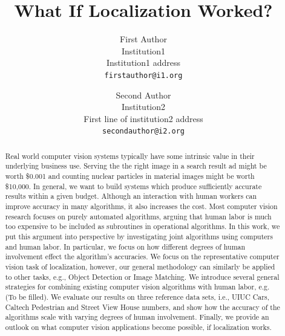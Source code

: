 \documentclass[10pt,twocolumn,letterpaper]{article}
\begin{document}
\title{What If Localization Worked?}

\author{First Author\\
Institution1\\
Institution1 address\\
{\tt\small firstauthor@i1.org}
\and
Second Author\\
Institution2\\
First line of institution2 address\\
{\tt\small secondauthor@i2.org}
}

\maketitle

\begin{abstract}
   Real world computer vision systems typically have some intrinsic value in their underlying business use. Serving the the right image in a search result ad might be worth \$0.001 and counting nuclear particles in material images might be worth \$10,000. In general, we want to build systems which produce sufficiently accurate results within a given budget. Although an interaction with human workers can improve accuracy in many algorithms, it also increases the cost. Most computer vision research focuses on purely automated algorithms, arguing that human labor is much too expensive to be included as subroutines in operational algorithms. In this work, we put this argument into perspective by investigating joint algorithms using computers and human labor. In particular, we focus on how different degrees of human involvement effect the algorithm's accuracies. We focus on the representative computer vision task of localization, however, our general methodology can similarly be applied to other tasks, e.g., Object Detection or Image Matching. We introduce several general strategies for combining existing computer vision algorithms with human labor, e.g. (To be filled). We evaluate our results on three reference data sets, i.e., UIUC Cars, Caltech Pedestrian and Street View House numbers, and show how the accuracy of the algorithms scale with varying degrees of human involvement. Finally, we provide an outlook on what computer vision applications become possible, if localization works.
\end{abstract}
\end{document}

